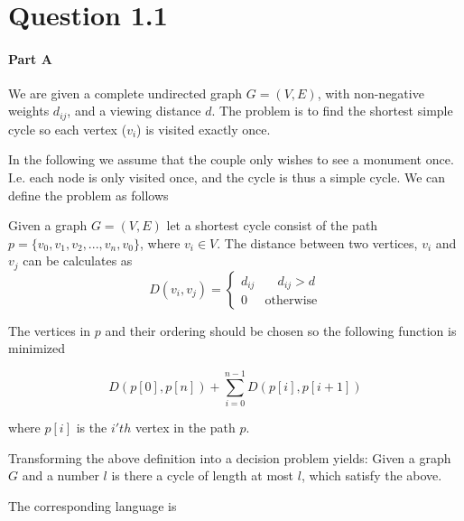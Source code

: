 \documentclass[10pt]{article}
\author{\authorName \\\texttt{\small{\authorEmail}}}
\title{\textsc{\titleName \\ \courseName}}
\begin{document}
\maketitle    

\section*{Question 1.1} %
\label{sec:question_1_1}
\paragraph{Part A} %
\label{par:part_a}

We are given a complete undirected graph $G = (V,E)$, with non-negative weights $d_{ij}$, and a viewing distance $d$. The problem is to find the shortest simple cycle so each vertex ($v_i$) is visited exactly once.

In the following we assume that the couple only wishes to see a monument once. I.e. each node is only visited once, and the cycle is thus a simple cycle. We can define the problem as follows

\begin{mydef}
Given a graph $G = (V, E)$ let a shortest cycle consist of the path $p = \{v_0, v_1,v_2,...,v_n, v_0\}$, where $v_i \in V$. The distance between two vertices, $v_i$ and $v_j$ can be calculates as
\begin{equation} 
D(v_i,v_j) = 
\begin{cases}
 d_{ij} &  \quad d_{ij}>d \\
 0      &  \text{otherwise}
\end{cases} 
\end{equation} 

The vertices in $p$ and their ordering should be chosen so the following function is minimized

\begin{equation}
  D(p[0],p[n])+\sum_{i=0}^{n-1} D(p[i],p[i+1])
\end{equation}

where $p[i]$ is the $i'th$ vertex in the path $p$.
\label{def1}
\end{mydef}

Transforming the above definition into a decision problem yields: Given a graph $G$ and a number $l$ is there a cycle of length at most $l$, which satisfy the above.

The corresponding language is
\end{document}
